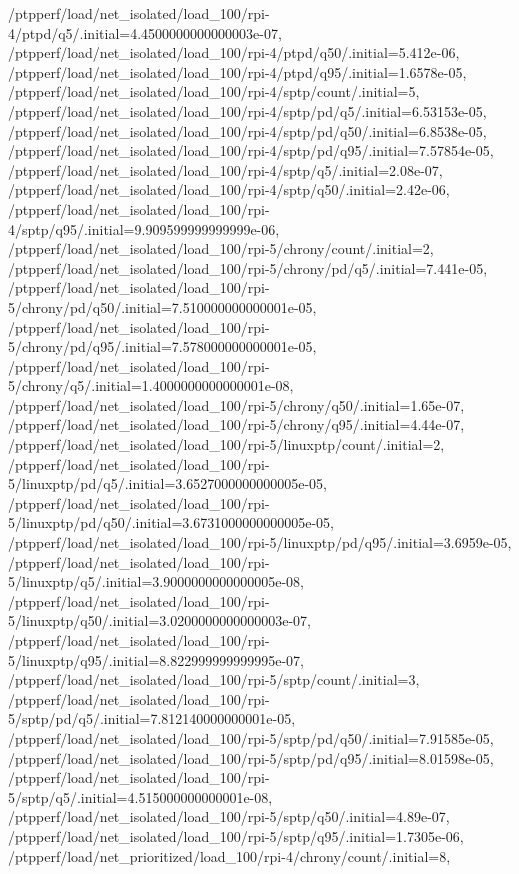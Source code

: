 {    /ptpperf/load/net_isolated/load_100/rpi-4/ptpd/q5/.initial=4.4500000000000003e-07,
    /ptpperf/load/net_isolated/load_100/rpi-4/ptpd/q50/.initial=5.412e-06,
    /ptpperf/load/net_isolated/load_100/rpi-4/ptpd/q95/.initial=1.6578e-05,
    /ptpperf/load/net_isolated/load_100/rpi-4/sptp/count/.initial=5,
    /ptpperf/load/net_isolated/load_100/rpi-4/sptp/pd/q5/.initial=6.53153e-05,
    /ptpperf/load/net_isolated/load_100/rpi-4/sptp/pd/q50/.initial=6.8538e-05,
    /ptpperf/load/net_isolated/load_100/rpi-4/sptp/pd/q95/.initial=7.57854e-05,
    /ptpperf/load/net_isolated/load_100/rpi-4/sptp/q5/.initial=2.08e-07,
    /ptpperf/load/net_isolated/load_100/rpi-4/sptp/q50/.initial=2.42e-06,
    /ptpperf/load/net_isolated/load_100/rpi-4/sptp/q95/.initial=9.909599999999999e-06,
    /ptpperf/load/net_isolated/load_100/rpi-5/chrony/count/.initial=2,
    /ptpperf/load/net_isolated/load_100/rpi-5/chrony/pd/q5/.initial=7.441e-05,
    /ptpperf/load/net_isolated/load_100/rpi-5/chrony/pd/q50/.initial=7.510000000000001e-05,
    /ptpperf/load/net_isolated/load_100/rpi-5/chrony/pd/q95/.initial=7.578000000000001e-05,
    /ptpperf/load/net_isolated/load_100/rpi-5/chrony/q5/.initial=1.4000000000000001e-08,
    /ptpperf/load/net_isolated/load_100/rpi-5/chrony/q50/.initial=1.65e-07,
    /ptpperf/load/net_isolated/load_100/rpi-5/chrony/q95/.initial=4.44e-07,
    /ptpperf/load/net_isolated/load_100/rpi-5/linuxptp/count/.initial=2,
    /ptpperf/load/net_isolated/load_100/rpi-5/linuxptp/pd/q5/.initial=3.6527000000000005e-05,
    /ptpperf/load/net_isolated/load_100/rpi-5/linuxptp/pd/q50/.initial=3.6731000000000005e-05,
    /ptpperf/load/net_isolated/load_100/rpi-5/linuxptp/pd/q95/.initial=3.6959e-05,
    /ptpperf/load/net_isolated/load_100/rpi-5/linuxptp/q5/.initial=3.9000000000000005e-08,
    /ptpperf/load/net_isolated/load_100/rpi-5/linuxptp/q50/.initial=3.0200000000000003e-07,
    /ptpperf/load/net_isolated/load_100/rpi-5/linuxptp/q95/.initial=8.822999999999995e-07,
    /ptpperf/load/net_isolated/load_100/rpi-5/sptp/count/.initial=3,
    /ptpperf/load/net_isolated/load_100/rpi-5/sptp/pd/q5/.initial=7.812140000000001e-05,
    /ptpperf/load/net_isolated/load_100/rpi-5/sptp/pd/q50/.initial=7.91585e-05,
    /ptpperf/load/net_isolated/load_100/rpi-5/sptp/pd/q95/.initial=8.01598e-05,
    /ptpperf/load/net_isolated/load_100/rpi-5/sptp/q5/.initial=4.515000000000001e-08,
    /ptpperf/load/net_isolated/load_100/rpi-5/sptp/q50/.initial=4.89e-07,
    /ptpperf/load/net_isolated/load_100/rpi-5/sptp/q95/.initial=1.7305e-06,
    /ptpperf/load/net_prioritized/load_100/rpi-4/chrony/count/.initial=8,
}
